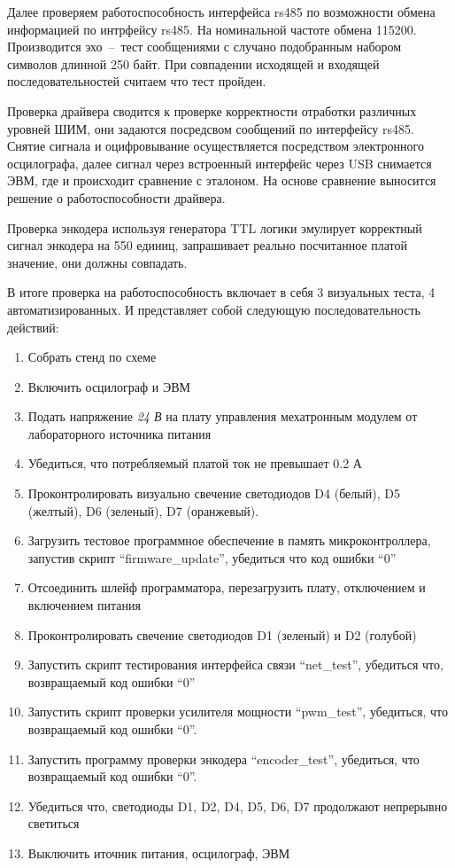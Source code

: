 Далее проверяем работоспособность интерфейса rs485 по
возможности обмена информацией по интрфейсу rs485. На номинальной частоте обмена
115200. Производится эхо~--~тест сообщениями с случано подобранным набором
символов длинной 250 байт. При совпадении исходящей и входящей
последовательностей считаем что тест пройден.

Проверка драйвера сводится к проверке корректности отработки различных уровней
ШИМ, они задаются посредсвом сообщений по интерфейсу rs485. Снятие сигнала и
оцифровывание осуществляется посредством электронного осцилографа, далее сигнал
через встроенный интерфейс через USB снимается ЭВМ, где и происходит сравнение
с эталоном. На основе сравнение выносится решение о работоспособности драйвера.

Проверка энкодера используя генератора TTL логики эмулирует корректный сигнал
энкодера на 550 единиц, запрашивает реально посчитанное платой значение, они
должны совпадать.

В итоге проверка на работоспособность включает в себя 3 визуальных теста, 4
автоматизированных. И представляет собой следующую последовательность действий:

\begin{enumerate}
    \item Собрать стенд по схеме
    \item Включить осцилограф и ЭВМ
    \item Подать напряжение \textit{24 В} на плату управления мехатронным
            модулем от лабораторного источника питания
    \item Убедиться, что потребляемый платой ток не превышает 0.2 А
    \item Проконтролировать визуально свечение светодиодов D4 (белый),
            D5 (желтый), D6 (зеленый), D7 (оранжевый).
    \item Загрузить тестовое программное обеспечение в память микроконтроллера,
            запустив скрипт ``firmware\_update'', убедиться что код ошибки ``0''
    \item Отсоединить шлейф программатора, перезагрузить плату, отключением и
            включением питания
    \item Проконтролировать свечение светодиодов D1 (зеленый) и D2 (голубой)
    \item Запустить скрипт тестирования интерфейса связи ``net\_test'',
            убедиться что, возвращаемый код ошибки ``0''
    \item Запустить скрипт проверки усилителя мощности ``pwm\_test'', убедиться,
            что возвращаемый код ошибки ``0''.
    \item Запустить программу проверки энкодера ``encoder\_test'', убедиться,
            что возвращаемый код ошибки ``0''.
    \item Убедиться что, светодиоды D1, D2, D4, D5, D6, D7 продолжают непрерывно
            светиться
    \item Выключить иточник питания, осцилограф, ЭВМ
\end{enumerate}
